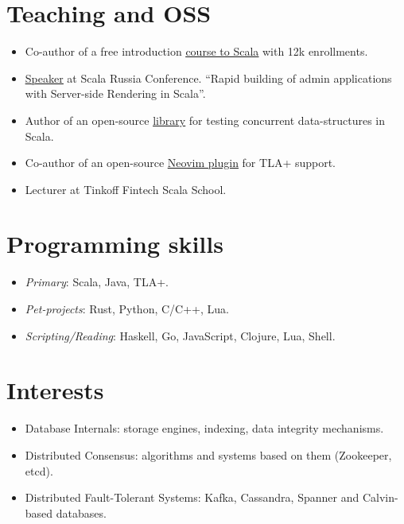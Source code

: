 \documentclass[paper=a4,fontsize=15pt]{scrartcl}
\begin{document}
\section*{Teaching and OSS}{}
\begin{itemize}[noitemsep,leftmargin=20pt,label=\raisebox{0.25ex}{\tiny$\bullet$},topsep=5pt]
  \item Co-author of a free introduction \href{https://stepik.org/course/16243}{\ul{course to Scala}} with 12k enrollments.
  \item \href{https://www.youtube.com/watch?v=8KxWi0xuDKs&t=15s}{\ul{Speaker}} at Scala Russia Conference. ``Rapid building of admin applications with Server-side Rendering in Scala''.
  \item Author of an open-source \href{https://github.com/susliko/lotos}{\ul{library}} for testing concurrent data-structures in Scala.
  \item Co-author of an open-source \href{https://github.com/susliko/tla.nvim}{\ul{Neovim plugin}} for TLA+ support.
  \item Lecturer at Tinkoff Fintech Scala School.
\end{itemize}

\section*{Programming skills}{}
\begin{itemize}[noitemsep,leftmargin=20pt,label=\raisebox{0.25ex}{\tiny$\bullet$},topsep=5pt]
    \item \textit{Primary}: Scala, Java, TLA+.
    \item \textit{Pet-projects}: Rust, Python, C/C++, Lua.
    \item \textit{Scripting/Reading}: Haskell, Go, JavaScript, Clojure, Lua, Shell.
\end{itemize}

\section*{Interests}{}
\begin{itemize}[noitemsep,leftmargin=20pt,label=\raisebox{0.25ex}{\tiny$\bullet$},topsep=5pt]
    \item Database Internals: storage engines, indexing, data integrity mechanisms.
    \item Distributed Consensus: algorithms and systems based on them (Zookeeper, etcd).
    \item Distributed Fault-Tolerant Systems: Kafka, Cassandra, Spanner and Calvin-based databases.
\end{itemize}
\end{document}
